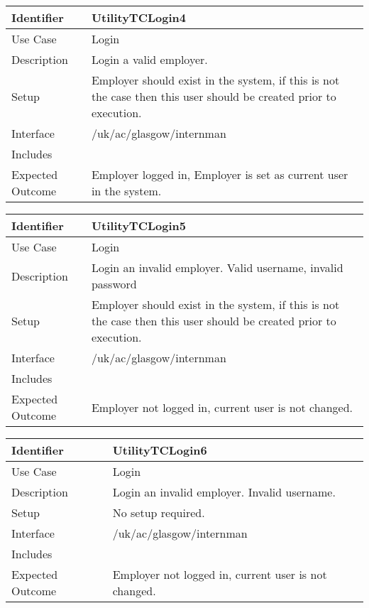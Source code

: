 \vspace{2em}

\begin{tabularx}{\textwidth}{|T|L|}
\hline
Identifier & UtilityTCLogin4\\
\hline
Use Case & Login \\
\hline
Description & Login a valid employer. \\
\hline
Setup & Employer should exist in the system, if this is not the case
then this user should be created prior to execution. \\
\hline
Interface & /uk/ac/glasgow/internman \\
\hline
Includes & \\
\hline
Expected Outcome & Employer  logged in, Employer is set as current
user in the system. \\
\hline
\end{tabularx}

\vspace{2em}

\begin{tabularx}{\textwidth}{|T|L|}
\hline
Identifier & UtilityTCLogin5\\
\hline
Use Case & Login \\
\hline
Description & Login an invalid employer. Valid username, invalid password\\
\hline
Setup & Employer should exist in the system, if this is not the case
then this user should be created prior to execution. \\
\hline
Interface & /uk/ac/glasgow/internman \\
\hline
Includes & \\
\hline
Expected Outcome & Employer not logged in, current user is not
changed.\\
\hline
\end{tabularx}

\vspace{2em}

\begin{tabularx}{\textwidth}{|T|L|}
\hline
Identifier & UtilityTCLogin6\\
\hline
Use Case & Login \\
\hline
Description & Login an invalid employer. Invalid username. \\
\hline
Setup & No setup required. \\
\hline
Interface & /uk/ac/glasgow/internman \\
\hline
Includes & \\
\hline
Expected Outcome & Employer not logged in, current user is not
changed.\\
\hline
\end{tabularx}

